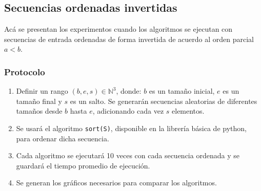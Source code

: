 \documentclass[letter]{article}
\begin{document}
\subsection{Secuencias ordenadas invertidas} \label{experimentos:invertidas}

Acá se presentan los experimentos cuando los algoritmos se ejecutan con secuencias de entrada ordenadas de forma invertida de acuerdo al orden parcial $a<b$.

\subsubsection{Protocolo}
\begin{enumerate}
    \item Definir un rango $(b,e,s)\in\mathbb{N}^3$, donde: $b$ es un tamaño inicial, $e$ es un tamaño final y $s$ es un salto. Se generarán secuencias aleatorias de diferentes tamaños desde $b$ hasta $e$, adicionando cada vez $s$ elementos.
    \item Se usará el algoritmo \texttt{sort(S)}, disponible en la librería básica de python, para ordenar dicha secuencia.
    \item Cada algoritmo se ejecutará 10 veces con cada secuencia ordenada y se guardará el tiempo promedio de ejecución.
    \item Se generan los gráficos necesarios para comparar los algoritmos.
\end{enumerate}
\end{document}

